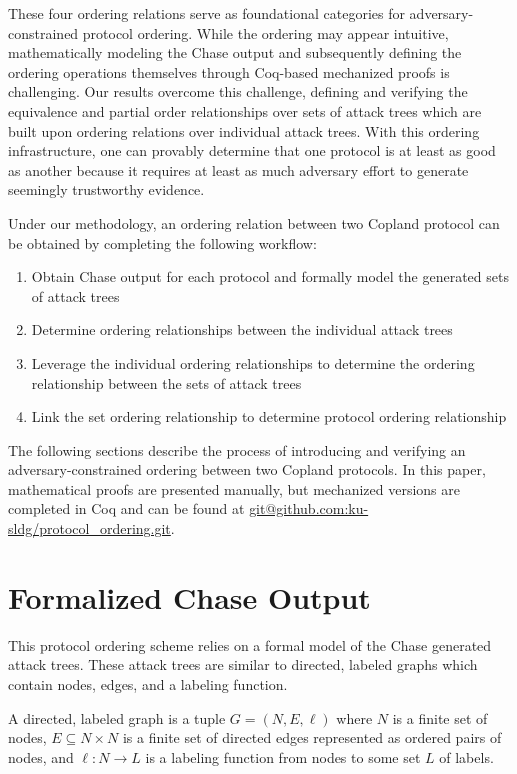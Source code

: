 \documentclass[runningheads]{llncs}
\theoremstyle{definition}
\newcommand{\squash}{\itemsep=0pt\parskip=0pt}
\begin{document}
These four ordering relations serve as foundational categories for adversary-constrained protocol ordering. While the ordering may appear intuitive, mathematically modeling the Chase output and subsequently defining the ordering operations themselves through Coq-based mechanized proofs is challenging. Our results overcome this challenge, defining and verifying the equivalence and partial order relationships over sets of attack trees which are built upon ordering relations over individual attack trees. With this ordering infrastructure, one can provably determine that one protocol is at least as good as another because it requires at least as much adversary effort to generate seemingly trustworthy evidence. 

Under our methodology, an ordering relation between two Copland protocol can be obtained by completing the following workflow:

\begin{enumerate}
    \squash
    \item Obtain Chase output for each protocol and formally model the generated sets of attack trees
    \item Determine ordering relationships between the individual attack trees
    \item Leverage the individual ordering relationships to determine the ordering relationship between the sets of attack trees
    \item Link the set ordering relationship to determine protocol ordering relationship
\end{enumerate}

The following sections describe the process of introducing and verifying an adversary-constrained ordering between two Copland protocols. In this paper, mathematical proofs are presented manually, but mechanized versions are completed in Coq and can be found at \url{git@github.com:ku-sldg/protocol_ordering.git}.


\section{Formalized Chase Output}

This protocol ordering scheme relies on a formal model of the Chase generated attack trees. These attack trees are similar to directed, labeled graphs which contain nodes, edges, and a labeling function. 

\begin{definition}[Graph]
    A directed, labeled graph is a tuple $G = (N, E, \ell)$ where $N$ is a finite set of nodes, $E \subseteq N \times N$ is a finite set of directed edges represented as ordered pairs of nodes, and $\ell : N \rightarrow L$ is a labeling function from nodes to some set $L$ of labels. 
\end{definition}
 
\end{document}
